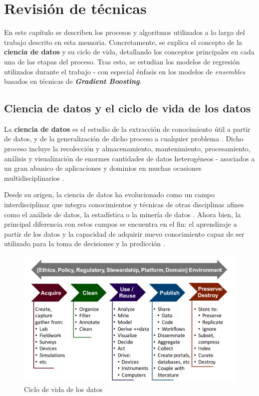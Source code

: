 \chapter{Revisión de técnicas}

En este capítulo se describen los procesos y algoritmos utilizados a lo largo del trabajo descrito en esta memoria. Concretamente, se explica el concepto de la \textbf{ciencia de datos} y su ciclo de vida, detallando los conceptos principales en cada una de las etapas del proceso. Tras esto, se estudian los modelos de regresión utilizados durante el trabajo - con especial énfasis en los modelos de \textit{ensembles} basados en técnicas de \textit{\textbf{Gradient Boosting}}.

\section{Ciencia de datos y el ciclo de vida de los datos}

La \textbf{ciencia de datos} es el estudio de la extracción de conocimiento útil a partir de datos, y de la generalización de dicho proceso a cualquier problema \cite{Donoho02102017}. Dicho proceso incluye la recolección y almacenamiento, mantenimiento, procesamiento, análisis y visualización de enormes cantidades de datos heterogéneos - asociados a un gran abanico de aplicaciones y dominios en muchas ocasiones multidisciplinarios \cite{10.1145/2500499}.

Desde su origen, la ciencia de datos ha evolucionado como un campo interdisciplinar que integra conocimientos y técnicas de otras disciplinas afines como el análisis de datos, la estadística o la minería de datos \cite{potential}. Ahora bien, la principal diferencia con estos campos se encuentra en el fin: el aprendizaje a partir de los datos \cite{Donoho02102017} y la capacidad de adquirir nuevo conocimiento capaz de ser utilizado para la toma de decisiones y la predicción \cite{10.1145/2500499}.

\begin{figure}[h]
	\centering
	\includegraphics[width=0.8\linewidth]{figs/chapter2/datalifecycle}
	\caption{Ciclo de vida de los datos \cite{potential}}
	\label{fig:datalifecycle}
\end{figure}

